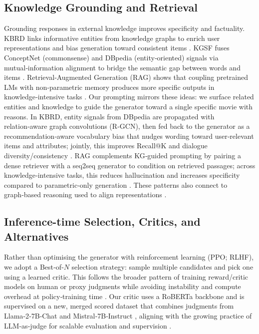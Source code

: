 \documentclass[12pt]{article}
\begin{document}
  \subsection{Knowledge Grounding and Retrieval}
  Grounding responses in external knowledge improves specificity and factuality. KBRD links informative entities from knowledge graphs to enrich user representations and bias generation toward consistent items \citep{chen2020kbrd}. KGSF fuses ConceptNet (commonsense) and DBpedia (entity‑oriented) signals via mutual‑information alignment to bridge the semantic gap between words and items \citep{zhou2020kgsf,speer2017conceptnet,dbpedia_wikipedia}. Retrieval‑Augmented Generation (RAG) shows that coupling pretrained LMs with non‑parametric memory produces more specific outputs in knowledge‑intensive tasks \citep{lewis2020rag}. Our prompting mirrors these ideas: we surface related entities and knowledge to guide the generator toward a single specific movie with reasons.
  In KBRD, entity signals from DBpedia are propagated with relation‑aware graph convolutions (R‑GCN), then fed back to the generator as a recommendation‑aware vocabulary bias that nudges wording toward user‑relevant items and attributes; jointly, this improves Recall@K and dialogue diversity/consistency \citep{chen2020kbrd}. RAG complements KG‑guided prompting by pairing a dense retriever with a seq2seq generator to condition on retrieved passages; across knowledge‑intensive tasks, this reduces hallucination and increases specificity compared to parametric‑only generation \citep{lewis2020rag}. These patterns also connect to graph‑based reasoning used to align representations \citep{velickovic2018deep}.
  
  \subsection{Inference-time Selection, Critics, and Alternatives}
  Rather than optimising the generator with reinforcement learning (PPO; RLHF), we adopt a Best‑of‑$N$ selection strategy: sample multiple candidates and pick one using a learned critic. This follows the broader pattern of training reward/critic models on human or proxy judgments \citep{rlhf_wikipedia} while avoiding instability and compute overhead at policy‑training time \citep{ppo_wikipedia}. Our critic uses a RoBERTa backbone \citep{liu2019roberta} and is supervised on a new, merged scored dataset that combines judgments from Llama‑2‑7B‑Chat and Mistral‑7B‑Instruct \citep{meta2023llama2,mistral2023}, aligning with the growing practice of LLM‑as‑judge for scalable evaluation and supervision \citep{yan2023llmjudge}.
  
\end{document}
